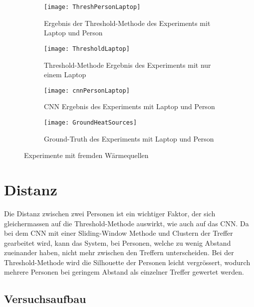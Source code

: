 \vspace{.5em}
\begin{figure}[H]
	\begin{subfigure}{.45\linewidth}
		\centering
		\texttt{[image: ThreshPersonLaptop]}
		\caption{Ergebnis der Threshold-Methode des Experiments mit Laptop und Person}
		\label{fig:ThreshPersonLaptop}
	\end{subfigure}\hfill%
	\begin{subfigure}{.45\linewidth}
		\centering
		\texttt{[image: ThresholdLaptop]}
		\caption{Threshold-Methode Ergebnis des Experiments mit nur einem Laptop}
		\label{fig:thresholdLaptop}
	\end{subfigure}
\begin{subfigure}{.45\linewidth}
	\centering
	\texttt{[image: cnnPersonLaptop]}
	\caption{\gls{CNN} Ergebnis des Experiments mit Laptop und Person}
	\label{fig:cnnPersonLaptop}
\end{subfigure}
	\begin{subfigure}{.55\linewidth}
		\centering
		\texttt{[image: GroundHeatSources]}
		\caption{Ground-Truth des Experiments mit Laptop und Person}
		\label{fig:groundPersonLaptop}
	\end{subfigure}
	\caption{Experimente mit fremden Wärmequellen}
	\label{fig:HeatSources}
\end{figure}
\vspace{.5em}



\section{Distanz}
\label{sec:distanz}

Die Distanz zwischen zwei Personen ist ein wichtiger Faktor, der sich gleichermassen auf die Threshold-Methode auswirkt, wie auch auf das \gls{CNN}. Da bei dem \gls{CNN} mit einer Sliding-Window Methode und Clustern der Treffer gearbeitet wird, kann das System, bei Personen, welche zu wenig Abstand zueinander haben, nicht mehr zwischen den Treffern unterscheiden. Bei der Threshold-Methode wird die Silhouette der Personen leicht vergrössert, wodurch mehrere Personen bei geringem Abstand als einzelner Treffer gewertet werden.

\subsection{Versuchsaufbau}

